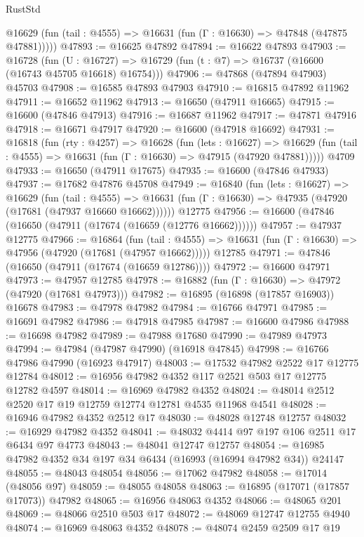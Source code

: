 \begin{lexlean}{RustStd}
\begin{coremodule}
{\begin{coremodule}
{{{{{{{{{{{{{{{{{{{{{{{{{{{{{{{{{{{{{{{{{{{{{{{{{{{{{{{      @16629 (fun (tail : @4555) => @16631 (fun (Γ : @16630) => @47848 (@47875 @47881)))))
@47893 := @16625 @47892
@47894 := @16622 @47893
@47903 := @16728
    (fun (U : @16727) => @16729 (fun (t : @7) => @16737 (@16600 (@16743 @45705 @16618) @16754)))
@47906 := @47868 (@47894 @47903) @45703
@47908 := @16585 @47893 @47903
@47910 := @16815 @47892 @11962
@47911 := @16652 @11962
@47913 := @16650 (@47911 @16665)
@47915 := @16600 (@47846 @47913)
@47916 := @16687 @11962
@47917 := @47871 @47916
@47918 := @16671 @47917
@47920 := @16600 (@47918 @16692)
@47931 := @16818
    (fun (rty : @4257) =>
    @16628
      (fun (lets : @16627) =>
      @16629 (fun (tail : @4555) => @16631 (fun (Γ : @16630) => @47915 (@47920 @47881)))))
    @4709
@47933 := @16650 (@47911 @17675)
@47935 := @16600 (@47846 @47933)
@47937 := @17682 @47876 @45708
@47949 := @16840
    (fun (lets : @16627) =>
    @16629
      (fun (tail : @4555) =>
      @16631 (fun (Γ : @16630) => @47935 (@47920 (@17681 (@47937 @16660 @16662))))))
    @12775
@47956 := @16600 (@47846 (@16650 (@47911 (@17674 (@16659 (@12776 @16662))))))
@47957 := @47937 @12775
@47966 := @16864
    (fun (tail : @4555) => @16631 (fun (Γ : @16630) => @47956 (@47920 (@17681 (@47957 @16662)))))
    @12785
@47971 := @47846 (@16650 (@47911 (@17674 (@16659 @12786))))
@47972 := @16600 @47971
@47973 := @47957 @12785
@47978 := @16882 (fun (Γ : @16630) => @47972 (@47920 (@17681 @47973)))
@47982 := @16895 (@16898 (@17857 @16903)) @16678
@47983 := @47978 @47982
@47984 := @16766 @47971
@47985 := @16691 @47982
@47986 := @47918 @47985
@47987 := @16600 @47986
@47988 := @16698 @47982
@47989 := @47988 @17680
@47990 := @47989 @47973
@47994 := @47984 (@47987 @47990) (@16918 @47845)
@47998 := @16766 @47986 @47990 (@16923 @47917)
@48003 := @17532 @47982 @2522 @17 @12775 @12784
@48012 := @16956 @47982 @4352 @117 @2521 @503 @17 @12775 @12782 @4597
@48014 := @16969 @47982 @4352
@48024 := @48014 @2512 @2520 @17 @19 @12759 @12774 @12781 @4535 @11968 @4541
@48028 := @16946 @47982 @4352 @2512 @17
@48030 := @48028 @12748 @12757
@48032 := @16929 @47982 @4352
@48041 := @48032 @4414 @97 @197 @106 @2511 @17 @6434 @97 @4773
@48043 := @48041 @12747 @12757
@48054 := @16985 @47982 @4352 @34 @197 @34 @6434 (@16993 (@16994 @47982 @34)) @24147
@48055 := @48043 @48054
@48056 := @17062 @47982
@48058 := @17014 (@48056 @97)
@48059 := @48055 @48058
@48063 := @16895 (@17071 (@17857 @17073)) @47982
@48065 := @16956 @48063 @4352
@48066 := @48065 @201
@48069 := @48066 @2510 @503 @17
@48072 := @48069 @12747 @12755 @4940
@48074 := @16969 @48063 @4352
@48078 := @48074 @2459 @2509 @17 @19
}}}}}}}}}}}}}}}}}}}}}}}}}}}}}}}}}}}}}}}}}}}}}}}}}}}}}}}
\end{coremodule}}
\end{coremodule}
\end{lexlean}
